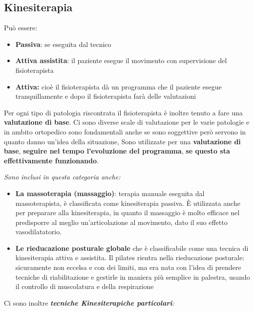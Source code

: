 \subsection{Kinesiterapia}

Può essere:

\begin{itemize}
\item
  \textbf{Passiva}: se eseguita dal tecnico
\item
  \textbf{Attiva assistita}: il paziente esegue il movimento con supervisione del fisioterapista
\item
  \textbf{Attiva:} cioè il fisioterapista dà un programma che il paziente esegue tranquillamente e dopo il fisioterapista farà delle valutazioni
\end{itemize}

Per ogni tipo di patologia riscontrata il fisioterapista è inoltre tenuto a fare una \textbf{valutazione di base}. Ci sono diverse scale di valutazione per le varie patologie e in ambito ortopedico sono fondamentali anche se sono soggettive però servono in quanto danno un'idea della situazione, Sono utilizzate per una \textbf{valutazione di
base}, \textbf{seguire nel tempo l'evoluzione del programma}, \textbf{se questo sta effettivamente funzionando}.

\emph{Sono inclusi in questa categoria anche:}

\begin{itemize}
\item
  \textbf{La massoterapia (massaggio)}: terapia manuale eseguita dal massoterapista, è classificata come kinesiterapia passiva. È utilizzata anche per preparare alla kinesiterapia, in quanto il massaggio è molto efficace nel predisporre al meglio un'articolazione al movimento, dato il suo effetto vasodilatatorio.
\item
  \textbf{Le rieducazione posturale globale} che è classificabile come una tecnica di kinesiterapia attiva e assistita. Il pilates rientra nella rieducazione posturale: sicuramente non eccelsa e con dei limiti, ma era nata con l'idea di prendere tecniche di riabilitazione e gestirle in maniera più semplice in palestra, usando il controllo di muscolatura e della respirazione
\end{itemize}

Ci sono inoltre \emph{\textbf{tecniche Kinesiterapiche particolari}:}

